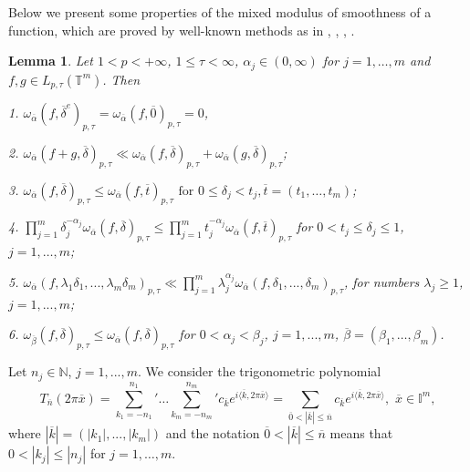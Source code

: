 \documentclass[12pt]{article}
\def\geq {\geqslant}
\theoremstyle{plain}
\newtheorem{lemma}{Lemma}[section]
\begin{document}
Below we present some properties of the mixed modulus of smoothness of a function, which are proved by well-known methods as in \cite{17}, \cite{10}, \cite{25}, \cite{2}.
\begin{lemma}\label{lem1 1}
Let 
 $1 < p < +\infty$, $1\leqslant \tau<\infty$, $\alpha_{j}\in (0, \infty)$ for $j=1, \ldots , m$ 
and $f, g \in L_{p, \tau}(\mathbb{T}^{m})$. Then 

1. $\omega_{\overline{\alpha}}(f, \overline\delta^{e})_{p, \tau}=\omega_{\overline{\alpha}}(f, \overline{0})_{p, \tau}=0$,

2. $\omega_{\overline{\alpha}}(f + g, \overline\delta)_{p, \tau}\ll\omega_{\overline{\alpha}}(f, \overline\delta)_{p, \tau} + \omega_{\overline{\alpha}}(g, \overline\delta)_{p, \tau}$;
 
3. $\omega_{\overline{\alpha}}(f, \overline\delta)_{p, \tau}\leqslant \omega_{\overline{\alpha}}(f, \overline{t})_{p, \tau} \, \, \text{for} \, \, 0\leqslant \delta_{j}<t_{j}, \overline{t}=(t_{1}, \ldots , t_{m})$; 

4. $\prod_{j=1}^{m}\delta_{j}^{-\alpha_{j}}\omega_{\overline{\alpha}}(f, \overline\delta)_{p, \tau}\leqslant \prod_{j=1}^{m}t_{j}^{-\alpha_{j}}\omega_{\overline{\alpha}}(f, \overline{t})_{p, \tau}$ for  $0<t_{j}\leqslant \delta_{j}\leqslant 1$,   $j=1, \ldots , m$; 

5. $\omega_{\overline{\alpha}}(f, \lambda_{1}\delta_{1}, ...,\lambda_{m}\delta_{m})_{p, \tau} \ll \prod_{j=1}^{m}\lambda_{j}^{\alpha_{j}}\omega_{\overline{\alpha}}(f, \delta_{1}, ...,\delta_{m})_{p, \tau}$,
for numbers 
$\lambda_{j} \geq 1$, $j=1,...,m$;

6. $\omega_{\overline{\beta}}(f, \overline\delta)_{p, \tau}\leqslant \omega_{\overline{\alpha}}(f, \overline\delta)_{p, \tau}$ for $0<\alpha_{j}<\beta_{j}$, $j=1,...,m$, $\overline\beta=(\beta_{1}, \ldots,\beta_{m})$. 
\end{lemma}

Let 
 $n_{j}\in \mathbb{N}$, $j=1,...,m$. We consider 
the trigonometric polynomial  
 \begin{equation}\label{eq1.1}
T_{\overline{n}}(2\pi\overline{x}) = {\sum\limits_{k_{1}=-n_{1}}^{n_{1}}}' \ldots {\sum\limits_{k_{m}=-n_{m}}^{n_{m}}}'c_{\overline{k}}e^{i\langle\overline{k} , 2\pi\overline{x}\rangle}=\sum\limits_{\overline{0}<|\overline{k}|\leqslant\overline{n}}c_{\overline{k}}e^{i\langle\overline{k} , 2\pi\overline{x}\rangle}, \, \,  \overline{x}\in \mathbb{I}^{m}, 
\end{equation} 
where 
 $|\overline{k}|=(|k_{1}|,...,|k_{m}|)$ and the notation $\overline{0}<|\overline{k}|\leqslant\overline{n}$ means that $0<|k_{j}|\leqslant |n_{j}|$ for $j=1, \dots, m$.
\end{document}

